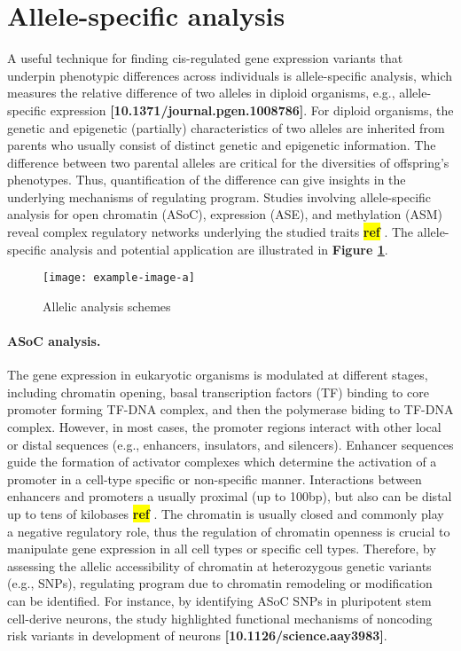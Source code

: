 \documentclass[12pt,usletter,fancy]{elegantbook}
\newcommand{\reqref}[1][ref]{
  \colorbox{yellow}{\textbf{#1}}
}
\begin{document}
\section*{Allele-specific analysis}
A useful technique for finding cis-regulated gene expression variants that underpin phenotypic differences across individuals is allele-specific analysis, which measures the relative difference of two alleles in diploid organisms, e.g., allele-specific expression \textbf{[10.1371/journal.pgen.1008786]}.
For diploid organisms, the genetic and epigenetic (partially) characteristics of two alleles are inherited from parents who usually consist of distinct genetic and epigenetic information.
The difference between two parental alleles are critical for the diversities of offspring's phenotypes.
Thus, quantification of the difference can give insights in the underlying mechanisms of regulating program.
Studies involving allele-specific analysis for open chromatin (ASoC), expression (ASE), and methylation (ASM) reveal complex regulatory networks underlying the studied traits\reqref.
The allele-specific analysis and potential application are illustrated in \textbf{Figure \ref{fig:example-image-a}}.
\begin{figure}[h]
  \centering
  \texttt{[image: example-image-a]}
  \vspace*{0.2cm}
  \caption{Allelic analysis schemes}
  \label{fig:example-image-a}
\end{figure}
\paragraph*{ASoC analysis.} The gene expression in eukaryotic organisms is modulated at different stages, including chromatin opening, basal transcription factors (TF) binding to core promoter forming TF-DNA complex, and then the polymerase biding to TF-DNA complex.
However, in most cases, the promoter regions interact with other local or distal sequences (e.g., enhancers, insulators, and silencers).
Enhancer sequences guide the formation of activator complexes which determine the activation of a promoter in a cell-type specific or non-specific manner.
Interactions between enhancers and promoters a usually proximal (up to 100bp), but also can be distal up to tens of kilobases\reqref.
The chromatin is usually closed and commonly play a negative regulatory role, thus the regulation of chromatin openness is crucial to manipulate gene expression in all cell types or specific cell types.
Therefore, by assessing the allelic accessibility of chromatin at heterozygous genetic variants (e.g., SNPs), regulating program due to chromatin remodeling or modification can be identified.
For instance, by identifying ASoC SNPs in pluripotent stem cell-derive neurons, the study highlighted functional mechanisms of noncoding risk variants in development of neurons \textbf{[10.1126/science.aay3983]}.
\end{document}
